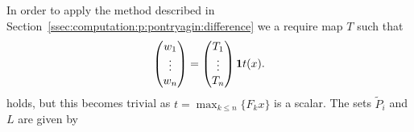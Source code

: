 \documentclass{elsarticle}
\providecommand{\conv}{\text{conv}}
\theoremstyle{remark}
\theoremstyle{definition}
\begin{document}
In order to apply the method described in Section~\ref{ssec:computation:p:pontryagin:difference} we a require map $T$ such that 
%
$$
\begin{pmatrix}
w_1\\ \vdots \\ w_n
\end{pmatrix} = \begin{pmatrix}T_1\\\vdots\\T_n\end{pmatrix}{\bf{1}}t(x).
$$
%
holds, but this becomes trivial as $t=\max_{k\leq n} \{F_kx\}$ is a scalar.
% 
The sets $\tilde P_i$ and $L$ are given by
%
\end{document}

